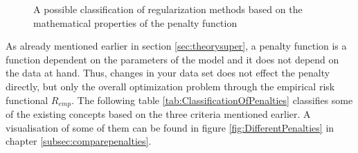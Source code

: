 \documentclass[12pt,a4paper]{article}
\begin{document}
\begin{figure}
\begin{center}
\end{center}
\caption{A possible classification of regularization methods based on the mathematical properties of the penalty function} \label{fig:Classification}
\end{figure}
As already mentioned earlier in section \ref{sec:theorysuper}, a penalty function is a function dependent on the parameters of the model and it does not depend on the data at hand. Thus, changes in your data set does not effect the penalty directly, but only the overall optimization problem through the empirical risk functional $R_{emp}$. The following table \ref{tab:ClassificationOfPenalties} classifies some of the existing concepts based on the three criteria mentioned earlier. A visualisation of some of them can be found in figure \ref{fig:DifferentPenalties} in chapter \ref{subsec:comparepenalties}.\\
\end{document}
